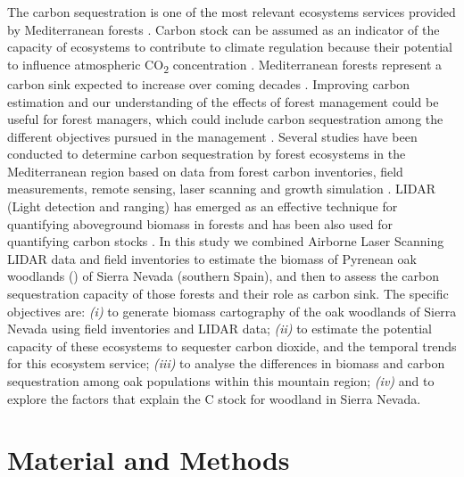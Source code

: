The carbon sequestration is one of the most relevant ecosystems services provided by Mediterranean forests \autocite{Gauquelinetal2018MediterraneanForests,NoceSantini2018MediterraneanForest}. Carbon stock can be assumed as an indicator of the capacity of ecosystems to contribute to climate regulation because their potential to influence atmospheric CO\textsubscript{2} concentration \autocite{Lauterbach2007AssessmentExisting,Luyssaertetal2008OldgrowthForests}. Mediterranean forests represent a carbon sink expected to increase over coming decades \autocite{Canellasetal2017CarbonSequestration,PasalodosTatoetal2017EvaluationTree}. Improving carbon estimation and our understanding of the effects of forest management could be useful for forest managers, which could include carbon sequestration among the different objectives pursued in the management \autocite{RuizPeinadoetal2017ForestManagement}. Several studies have been conducted to determine carbon sequestration by forest ecosystems in the Mediterranean region based on data from forest carbon inventories, field measurements, remote sensing, laser scanning and growth simulation \autocites[\emph{e.g.}][]{Canellasetal2008SilvicultureCarbon,Chiesietal2005ModellingCarbon,Garciaetal2010EstimatingBiomass,GuerraHernandezetal2016ComparisonALS,Simonsonetal2016ModellingAboveground,Vayredaetal2012SpatialPatterns}. LIDAR (Light detection and ranging) has emerged as an effective technique for quantifying aboveground biomass in forests \autocite{Belandetal2019PromotingUse,Lefskyetal2002LidarRemote,Xiaoetal2019RemoteSensing} and has been also used for quantifying carbon stocks \autocite{Simonsonetal2016ModellingAboveground,Zhaoetal2018UtilityMultitemporal}. In this study we combined Airborne Laser Scanning LIDAR data and field inventories to estimate the biomass of Pyrenean oak woodlands (\Qp) of Sierra Nevada (southern Spain), and then to assess the carbon sequestration capacity of those forests and their role as carbon sink. The specific objectives are: \emph{(i)} to generate biomass cartography of the oak woodlands of Sierra Nevada using field inventories and LIDAR data; \emph{(ii)} to estimate the potential capacity of these ecosystems to sequester carbon dioxide, and the temporal trends for this ecosystem service; \emph{(iii)} to analyse the differences in biomass and carbon sequestration among oak populations within this mountain region; \emph{(iv)} and to explore the factors that explain the C stock for \Qp woodland in Sierra Nevada.

\section{Material and Methods}\label{sec:carbon:mat}
